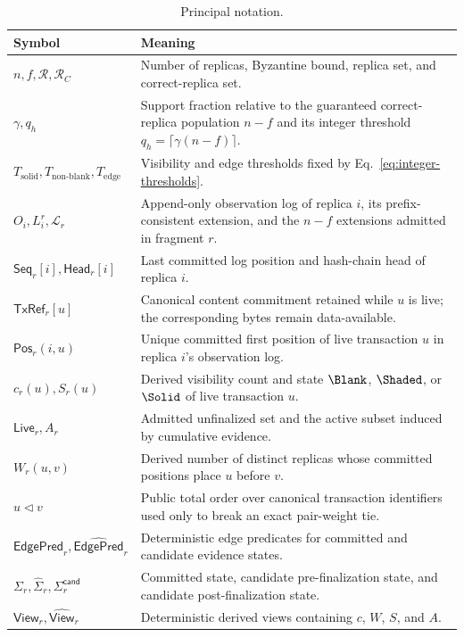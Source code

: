 \begin{table}[t]
\centering
\caption{Principal notation.}
\label{tab:notation}
\renewcommand{\arraystretch}{1.08}
\begin{tabular}{p{}p{}}
\hline
\textbf{Symbol} & \textbf{Meaning} \\
\hline
$n,f,\mathcal R,\mathcal R_C$ & Number of replicas, Byzantine bound, replica set, and correct-replica set. \\
$\gamma,q_h$ & Support fraction relative to the guaranteed correct-replica population $n-f$ and its integer threshold $q_h=\lceil\gamma(n-f)\rceil$. \\
$T_{\mathrm{solid}},T_{\mathrm{non\mbox{-}blank}},T_{\mathrm{edge}}$ & Visibility and edge thresholds fixed by Eq.~\eqref{eq:integer-thresholds}. \\
$O_i,L_i^r,\mathcal L_r$ & Append-only observation log of replica $i$, its prefix-consistent extension, and the $n-f$ extensions admitted in fragment $r$. \\
$\mathsf{Seq}_r[i],\mathsf{Head}_r[i]$ & Last committed log position and hash-chain head of replica $i$. \\
$\mathsf{TxRef}_r[u]$ & Canonical content commitment retained while $u$ is live; the corresponding bytes remain data-available. \\
$\mathsf{Pos}_r(i,u)$ & Unique committed first position of live transaction $u$ in replica $i$'s observation log. \\
$c_r(u),S_r(u)$ & Derived visibility count and state $\Blank$, $\Shaded$, or $\Solid$ of live transaction $u$. \\
$\mathsf{Live}_r,A_r$ & Admitted unfinalized set and the active subset induced by cumulative evidence. \\
$W_r(u,v)$ & Derived number of distinct replicas whose committed positions place $u$ before $v$. \\
$u\triangleleft v$ & Public total order over canonical transaction identifiers used only to break an exact pair-weight tie. \\
$\mathsf{EdgePred}_r,\widehat{\mathsf{EdgePred}}_r$ & Deterministic edge predicates for committed and candidate evidence states. \\
$\Sigma_r,\widehat\Sigma_r,\Sigma_r^{\mathsf{cand}}$ & Committed state, candidate pre-finalization state, and candidate post-finalization state. \\
$\mathsf{View}_r,\widehat{\mathsf{View}}_r$ & Deterministic derived views containing $c$, $W$, $S$, and $A$. \\

\end{tabular}
\end{table}
